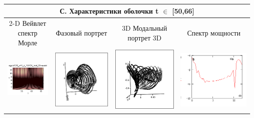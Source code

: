 \documentclass[12pt,letterpaper]{extreport}
\begin{document}
\begin{table}[H]
{\begin{tabular}{|c|c|c|c|}
\multicolumn{4}{|c|}{С. Характеристики оболочки  t $\in$ [50,66]}\\

\hline
\footnotesize 2-D Вейвлет спектр Морле&\footnotesize Фазовый 
портрет&\footnotesize 3D Модальный портрет 3D&\footnotesize Спектр мощности\\
\hline
	\includegraphics[scale=1]{c1} 	
	&	
	\includegraphics[scale=0.9]{c2} 	
	&	
	\includegraphics[scale=0.9]{c3} 
	&
	\includegraphics[scale=0.9]{c4} 
\\
\hline


\end{tabular}}
\end{table}
\end{document}

